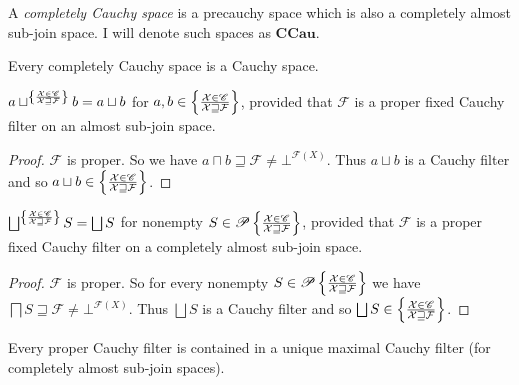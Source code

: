 \begin{defn}
  A \emph{completely Cauchy space} is a precauchy space which is also a completely almost sub-join space.
I will denote such spaces as $\mathbf{CCau}$.
\end{defn}

\begin{obvious}
Every completely Cauchy space is a Cauchy space.
\end{obvious}

\begin{prop}
  $a\sqcup^{
    \left\{ \frac{\mathcal{X} \in \mathscr{C} }{\mathcal{X} \sqsupseteq \mathcal{F}}\right\}
  } b = a\sqcup b$ for
  $a,b \in \left\{ \frac{\mathcal{X} \in \mathscr{C} }{\mathcal{X} \sqsupseteq \mathcal{F}}\right\}$,
  provided that $\mathcal{F}$ is a proper fixed Cauchy filter on an almost sub-join space.
\end{prop}

\begin{proof}
  $\mathcal{F}$ is proper. So
  we have $a \sqcap b \sqsupseteq \mathcal{F} \neq \bot^{\mathscr{F} (X)}$. Thus $a\sqcup b$ is a Cauchy
  filter and so $a\sqcup b \in \left\{ \frac{\mathcal{X} \in \mathscr{C} }{\mathcal{X} \sqsupseteq \mathcal{F}}\right\}$.
\end{proof}

\begin{prop}
  $\bigsqcup^{
    \setcond{\mathcal{X} \in \mathscr{C} }{\mathcal{X} \sqsupseteq \mathcal{F}}
  } S = \bigsqcup S$ for nonempty
  $S \in \mathscr{P} \left\{ \frac{\mathcal{X} \in \mathscr{C} }{\mathcal{X} \sqsupseteq \mathcal{F}}\right\}$,
  provided that $\mathcal{F}$ is a proper fixed Cauchy filter on a completely almost sub-join space.
\end{prop}

\begin{proof}
  $\mathcal{F}$ is proper. So for every nonempty $S \in \mathscr{P}
  \left\{ \frac{\mathcal{X} \in \mathscr{C} }{\mathcal{X} \sqsupseteq \mathcal{F}}\right\}$
  we have $\bigsqcap S \sqsupseteq \mathcal{F} \neq \bot^{\mathscr{F} (X)}$. Thus $\bigsqcup S$ is a Cauchy
  filter and so $\bigsqcup S \in \setcond{\mathcal{X} \in \mathscr{C} }{\mathcal{X} \sqsupseteq \mathcal{F}}$.
\end{proof}

\begin{cor}
Every proper Cauchy filter is contained in a unique maximal Cauchy filter (for completely almost sub-join spaces).
\end{cor}

